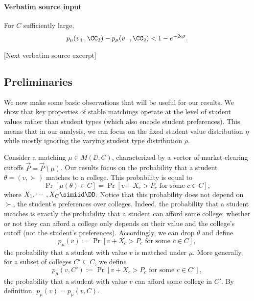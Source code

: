 \documentclass[10pt]{article}
\begin{document}
\paragraph{Verbatim source input}
\begin{ReviewVerbatim}
\begin{proposition}\label{prop:lt-approx-F2}
For $C$ sufficiently large,
\begin{equation}
    p_\mu(v_+, \CC_2) - p_\mu(v_-, \CC_2) < 1 - e^{-2\epsilon\sigma}.
\end{equation}
\end{proposition}

[Next verbatim source excerpt]

\subsection{Preliminaries}
We now make some basic observations that will be useful for our results. We show that key properties of stable matchings operate at the level of student values rather than student types (which also encode student preferences). This means that in our analysis, we can focus on the fixed student value distribution $\eta$ while mostly ignoring the varying student type distribution $\rho$.

Consider a matching $\mu\in M(\DD, C)$, characterized by a vector of market-clearing cutoffs $\vec{P}=\vec{P}(\mu)$. Our results focus on the probability that a student $\theta=(v,\succ)$ matches to a college. This probability is equal to
\begin{equation}
    \Pr[\mu(\theta)\in C] = \Pr[v + X_c > P_c\text{ for some $c\in C$}],
\end{equation}
where $X_1, \cdots, X_C \simiid \DD.$ Notice that this probability does not depend on $\succ$, the student's preferences over colleges. Indeed, the probability that a student matches is exactly the probability that a student can afford some college; whether or not they can afford a college only depends on their value and the college's cutoff (not the student's preferences). Accordingly, we can drop $\theta$ and define
\begin{equation}
    p_\mu(v) := \Pr[v + X_c > P_c\text{ for some $c\in C$}],
\end{equation}
the probability that a student with value $v$ is matched under $\mu$. More generally, for a subset of colleges $C'\subseteq C$, we define
\begin{equation}
    p_\mu(v, C') := \Pr[v + X_c > P_c\text{ for some $c\in C'$}],
\end{equation}
the probability that a student with value $v$ can afford some college in $C'$. By definition, $p_\mu(v) = p_\mu(v, C).$


\end{ReviewVerbatim}
\end{document}
